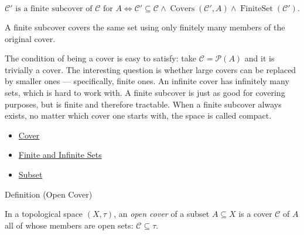 \begin{remark*}
\[
  \mathcal{C}'\text{ is a finite subcover of }\mathcal{C}\text{ for }A
  \iff
  \mathcal{C}'\subseteq\mathcal{C}
  \wedge
  \operatorname{Covers}(\mathcal{C}',A)
  \wedge
  \operatorname{FiniteSet}(\mathcal{C}').
\]
\end{remark*}

\begin{remark*}[Interpretation]
A finite subcover covers the same set using only finitely many members of the
original cover.
\end{remark*}


\begin{remark*}[Exposition]
The condition of being a cover is easy to satisfy: take $\mathcal{C} =
\mathcal{P}(A)$ and it is trivially a cover. The interesting question is
whether large covers can be replaced by smaller ones --- specifically, finite
ones. An infinite cover has infinitely many sets, which is hard to work with.
A finite subcover is just as good for covering purposes, but is finite and
therefore tractable. When a finite subcover always exists, no matter which
cover one starts with, the space is called compact.
\end{remark*}

\begin{dependencies}
\begin{itemize}
  \item \hyperref[def:cover-full]{Cover}
  \item \hyperref[def:finite-infinite]{Finite and Infinite Sets}
  \item \hyperref[def:subset]{Subset}
\end{itemize}
\end{dependencies}

\begin{definitionbox}{Definition (Open Cover)}
\begin{definition}\label{def:open-cover}
In a topological space $(X, \tau)$, an \emph{open cover} of a subset $A
\subseteq X$ is a cover $\mathcal{C}$ of $A$ all of whose members are open
sets: $\mathcal{C} \subseteq \tau$.
\end{definition}
\end{definitionbox}

